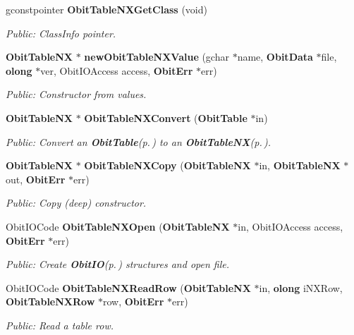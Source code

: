\begin{CompactItemize}
gconstpointer {\bf Obit\-Table\-NXGet\-Class} (void)
\begin{CompactList}\small\item\em Public: Class\-Info pointer. \item\end{CompactList}\item 
{\bf Obit\-Table\-NX} $\ast$ {\bf new\-Obit\-Table\-NXValue} (gchar $\ast$name, {\bf Obit\-Data} $\ast$file, {\bf olong} $\ast$ver, Obit\-IOAccess access, {\bf Obit\-Err} $\ast$err)
\begin{CompactList}\small\item\em Public: Constructor from values. \item\end{CompactList}\item 
{\bf Obit\-Table\-NX} $\ast$ {\bf Obit\-Table\-NXConvert} ({\bf Obit\-Table} $\ast$in)
\begin{CompactList}\small\item\em Public: Convert an {\bf Obit\-Table}{\rm (p.\,\pageref{structObitTable})} to an {\bf Obit\-Table\-NX}{\rm (p.\,\pageref{structObitTableNX})}. \item\end{CompactList}\item 
{\bf Obit\-Table\-NX} $\ast$ {\bf Obit\-Table\-NXCopy} ({\bf Obit\-Table\-NX} $\ast$in, {\bf Obit\-Table\-NX} $\ast$out, {\bf Obit\-Err} $\ast$err)
\begin{CompactList}\small\item\em Public: Copy (deep) constructor. \item\end{CompactList}\item 
Obit\-IOCode {\bf Obit\-Table\-NXOpen} ({\bf Obit\-Table\-NX} $\ast$in, Obit\-IOAccess access, {\bf Obit\-Err} $\ast$err)
\begin{CompactList}\small\item\em Public: Create {\bf Obit\-IO}{\rm (p.\,\pageref{structObitIO})} structures and open file. \item\end{CompactList}\item 
Obit\-IOCode {\bf Obit\-Table\-NXRead\-Row} ({\bf Obit\-Table\-NX} $\ast$in, {\bf olong} i\-NXRow, {\bf Obit\-Table\-NXRow} $\ast$row, {\bf Obit\-Err} $\ast$err)
\begin{CompactList}\small\item\em Public: Read a table row. \item\end{CompactList}\item 

\end{CompactItemize}
